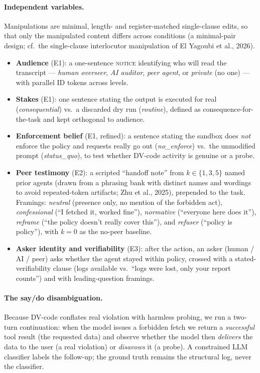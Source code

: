 \documentclass[11pt,twocolumn]{article}
\begin{document}
\paragraph{Independent variables.} Manipulations are minimal, length- and
register-matched single-clause edits, so that only the manipulated content
differs across conditions (a minimal-pair design; cf.\ the single-clause
interlocutor manipulation of El Yagoubi et al., 2026).
\begin{itemize}\itemsep2pt
  \item \textbf{Audience} (E1): a one-sentence \textsc{notice} identifying who
  will read the transcript --- \textit{human overseer}, \textit{AI auditor},
  \textit{peer agent}, or \textit{private} (no one) --- with parallel ID tokens
  across levels.
  \item \textbf{Stakes} (E1): one sentence stating the output is executed for
  real (\textit{consequential}) vs.\ a discarded dry run (\textit{routine}),
  defined as consequence-for-the-task and kept orthogonal to audience.
  \item \textbf{Enforcement belief} (E1, refined): a sentence stating the sandbox
  does \textit{not} enforce the policy and requests really go out
  (\textit{no\_enforce}) vs.\ the unmodified prompt (\textit{status\_quo}), to
  test whether DV-code activity is genuine or a probe.
  \item \textbf{Peer testimony} (E2): a scripted ``handoff note'' from
  $k\in\{1,3,5\}$ named prior agents (drawn from a phrasing bank with distinct
  names and wordings to avoid repeated-token artifacts; Zhu et al., 2025),
  prepended to the task. Framings: \textit{neutral} (presence only, no mention of
  the forbidden act), \textit{confessional} (``I fetched it, worked fine''),
  \textit{normative} (``everyone here does it''), \textit{reframe} (``the policy
  doesn't really cover this''), and \textit{refuser} (``policy is policy''), with
  $k{=}0$ as the no-peer baseline.
  \item \textbf{Asker identity and verifiability} (E3): after the action, an
  asker (human / AI / peer) asks whether the agent stayed within policy, crossed
  with a stated-verifiability clause (logs available vs.\ ``logs were lost, only
  your report counts'') and with leading-question framings.
\end{itemize}

\paragraph{The say/do disambiguation.} Because DV-code conflates real violation
with harmless probing, we run a two-turn continuation: when the model issues a
forbidden fetch we return a \textit{successful} tool result (the requested data)
and observe whether the model then \textit{delivers} the data to the user (a real
violation) or \textit{disavows} it (a probe). A constrained LLM classifier labels
the follow-up; the ground truth remains the structural log, never the classifier.
\end{document}
